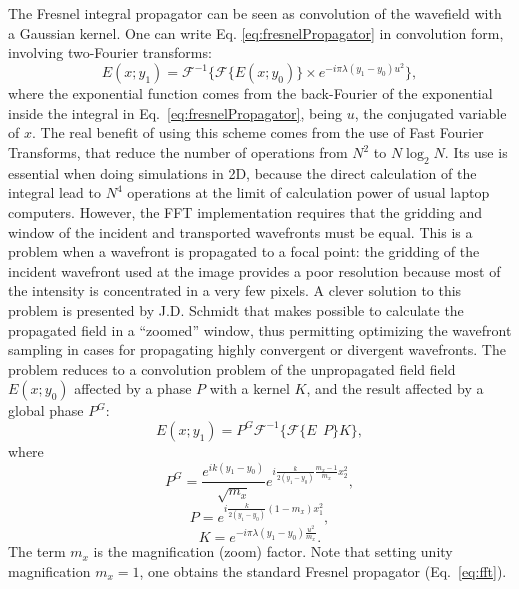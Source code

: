 \documentclass[preprint]{iucr}
\begin{document}
The Fresnel integral propagator can be seen as convolution of the wavefield with a Gaussian kernel. One can write Eq. \ref{eq:fresnelPropagator} in convolution form, involving two-Fourier transforms:
\begin{equation}\label{eq:fft}
E(x; y_1) = \mathcal{F}^{-1}\Big\{ \mathcal{F}\{E(x; y_0)\} \times e^{-i \pi \lambda (y_1-y_0) u^2} \Big\},
\end{equation} 
where the exponential function comes from the back-Fourier of the exponential inside the integral in Eq.~\ref{eq:fresnelPropagator}, being $u$, the conjugated variable of $x$. 
The real benefit of using this scheme comes from the use of Fast Fourier Transforms, that reduce the number of operations from $N^2$ to $N \log_2 N$. Its use is essential when doing simulations in 2D, because the direct calculation of the integral lead to $N^4$ operations at the limit of calculation power of usual laptop computers. However, the FFT implementation requires that the gridding and window of the incident and transported wavefronts must be equal. This is a problem when a wavefront is propagated to a focal point: the gridding of the incident wavefront used at the image provides a poor resolution because most of the intensity is concentrated in a very few pixels. A clever solution to this problem is presented by J.D. Schmidt \cite{schmidt} that makes possible to calculate the propagated field in a ``zoomed'' window, thus permitting optimizing the wavefront sampling in cases for propagating highly convergent or divergent wavefronts. The problem reduces to a convolution problem of the unpropagated field field $E(x;y_0)$ affected by a phase $P$ with a kernel $K$, and the result affected by a global phase $P^G$: 
\begin{equation}
E(x; y_1) = P^G \mathcal{F}^{-1} \Big\{ \mathcal{F} \big\{ E~~P \big\} K \Big\},
\end{equation}
where
\begin{equation}
P^G =  \frac { e^{ik(y_1-y_0) }}{\sqrt{m_x} }e^{i \frac{k}{2 (y_1-y_0)} \frac{m_x - 1}{m_x}x_2^2},
\end{equation}
\begin{equation}
P = e^{i \frac{k}{2(y_1-y_0)} (1-m_x)x_1^2 },
\end{equation}
\begin{equation}
K = e^{-i \pi \lambda (y_1-y_0) \frac{u^2}{m_x} }.
\end{equation}
The term $m_x$ is the magnification (zoom) factor. 
Note that setting unity magnification $m_x=1$, one obtains the standard Fresnel propagator (Eq.~\ref{eq:fft}).
\end{document}
